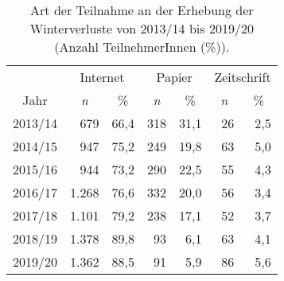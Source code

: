 \begin{table}[H]
    \centering
    \caption{Art der Teilnahme an der Erhebung der Winterverluste von 2013/14 bis 2019/20 (Anzahl TeilnehmerInnen (\%)).}
    \label{tab:u:teilnameart}
    \begin{tabular}{c|*{2}{rr|}rr}
            \multicolumn{1}{c}{}& 
            \multicolumn{2}{c}{Internet} & 
            \multicolumn{2}{c}{Papier} & 
            \multicolumn{2}{c}{Zeitschrift} \\
        \cline{2-7}
            \multicolumn{1}{c}{Jahr} & 
            \multicolumn{1}{c}{\textit{n}} & 
            \multicolumn{1}{c}{\%} & 
            \multicolumn{1}{c}{\textit{n}} & 
            \multicolumn{1}{c}{\%} & 
            \multicolumn{1}{c}{\textit{n}} & 
            \multicolumn{1}{c}{\%} \\
        \hline
        2013/14 &   679 & 66,4 & 318 & 31,1 & 26 & 2,5 \\
        2014/15 &   947 & 75,2 & 249 & 19,8 & 63 & 5,0 \\
        2015/16 &   944 & 73,2 & 290 & 22,5 & 55 & 4,3 \\
        2016/17 & 1.268 & 76,6 & 332 & 20,0 & 56 & 3,4 \\
        2017/18 & 1.101 & 79,2 & 238 & 17,1 & 52 & 3,7 \\
        2018/19 & 1.378 & 89,8 &  93 &  6,1 & 63 & 4,1 \\
        2019/20 & 1.362 & 88,5 &  91 &  5,9 & 86 & 5,6 \\
        \hline
    \end{tabular}
\end{table}